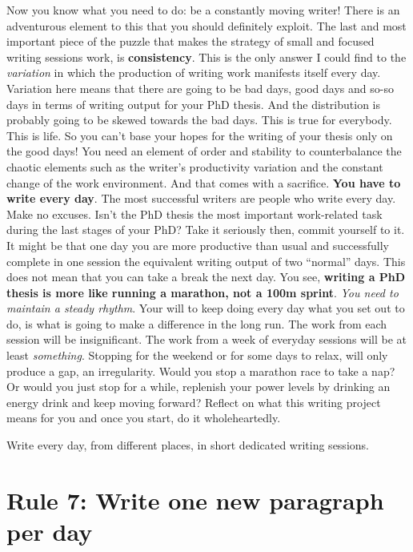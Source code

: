 \documentclass[
  12pt,
]{book}
\begin{document}
Now you know what you need to do: be a constantly moving writer!
There is an adventurous element to this that you should definitely exploit.
The last and most important piece of the puzzle that makes the strategy of small and focused writing sessions work, is \textbf{consistency}.
This is the only answer I could find to the \emph{variation} in which the production of writing work manifests itself every day.
Variation here means that there are going to be bad days, good days and so-so days in terms of writing output for your PhD thesis.
And the distribution is probably going to be skewed towards the bad days.
This is true for everybody.
This is life.
So you can't base your hopes for the writing of your thesis only on the good days!
You need an element of order and stability to counterbalance the chaotic elements such as the writer's productivity variation and the constant change of the work environment.
And that comes with a sacrifice.
\textbf{You have to write every day}.
The most successful writers are people who write every day.
Make no excuses.
Isn't the PhD thesis the most important work-related task during the last stages of your PhD?
Take it seriously then, commit yourself to it.
It might be that one day you are more productive than usual and successfully complete in one session the equivalent writing output of two ``normal'' days.
This does not mean that you can take a break the next day.
You see, \textbf{writing a PhD thesis is more like running a marathon, not a 100m sprint}.
\emph{You need to maintain a steady rhythm}.
Your will to keep doing every day what you set out to do, is what is going to make a difference in the long run.
The work from each session will be insignificant.
The work from a week of everyday sessions will be at least \emph{something}.
Stopping for the weekend or for some days to relax, will only produce a gap, an irregularity.
Would you stop a marathon race to take a nap?
Or would you just stop for a while, replenish your power levels by drinking an energy drink and keep moving forward?
Reflect on what this writing project means for you and once you start, do it wholeheartedly.

Write every day, from different places, in short dedicated writing sessions.

\hypertarget{rule7}{%
\section*{\texorpdfstring{\textbf{Rule 7:} Write one new paragraph per day}{Rule 7: Write one new paragraph per day}}\label{rule7}}
\end{document}
